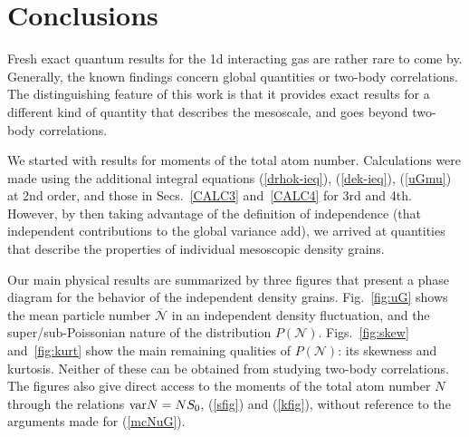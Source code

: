\documentclass[aps,twocolumn,pra,superscriptaddress,nofootinbib,amsmath,amssymb,floats,floatfix,english]{revtex4-1}
\newcommand{\mc}[1]{{\mathcal{#1}}}
\newcommand{\wb}[1]{{\overline{#1}}}
\newcommand{\eqn}[1]{(\ref{#1})}
\begin{document}
\section{Conclusions}
\label{CONCLUSIONS}

Fresh exact quantum results for the 1d interacting gas are rather rare to come by.
Generally, the known findings concern global quantities or two-body correlations. 
The distinguishing feature of this work is that it provides exact results for a different kind of quantity that describes the mesoscale, and goes beyond two-body correlations. 

We started with results for moments of the total atom number. Calculations were made using the additional integral equations \eqn{drhok-ieq}, \eqn{dek-ieq}, \eqn{uGmu} at 2nd order, and those in Secs.~\ref{CALC3} and~\ref{CALC4} for 3rd and 4th. However, by then taking advantage of the definition of independence (that independent contributions to the global variance add), we arrived at quantities that describe the properties of individual mesoscopic density grains.

Our main physical results are summarized by three figures that present a phase diagram for the behavior of the independent density grains. Fig.~\ref{fig:uG} shows the mean particle number $\wb{\mc{N}}$ in an independent density fluctuation, and the super/sub-Poissonian nature of the distribution $P(\mc{N})$. 
Figs.~\ref{fig:skew} and~\ref{fig:kurt} show the main remaining qualities of $P(\mc{N})$: its skewness and kurtosis. Neither of these can be obtained from studying two-body correlations.
The figures also give direct access to the moments of the total atom number $N$ through the relations ${\rm var}N=N S_0$, \eqn{sfig} and \eqn{kfig},
 without reference to the arguments made for \eqn{mcNuG}. 
 
\end{document}
